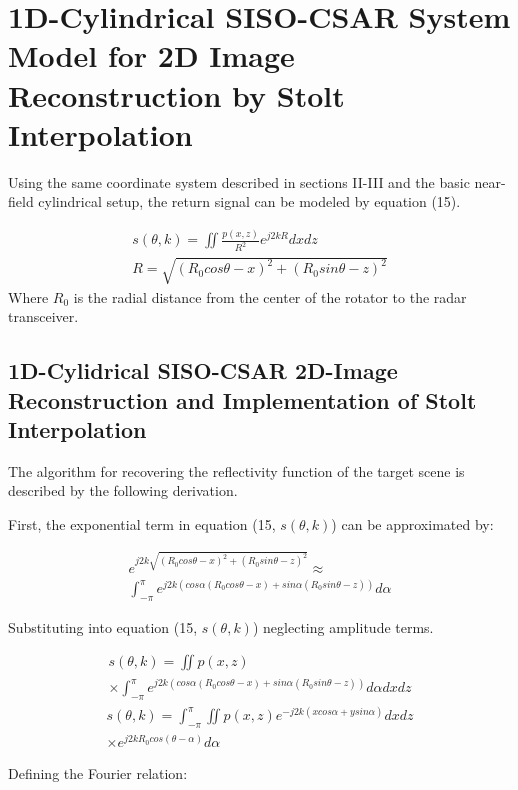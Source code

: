 \documentclass{IEEEtran}
\begin{document}


\section{1D-Cylindrical SISO-CSAR System Model for 2D Image Reconstruction by Stolt Interpolation}
Using the same coordinate system described in sections II-III and the basic near-field cylindrical setup, the return signal can be modeled by equation (15).

\begin{gather}
	s(\theta,k) = \iint \frac{p(x,z)}{R^2}e^{j2kR}dxdz \\
	R = \sqrt{(R_0 cos\theta - x)^2 + (R_0 sin\theta - z)^2}
\end{gather}
Where $R_0$ is the radial distance from the center of the rotator to the radar transceiver.

\subsection{1D-Cylidrical SISO-CSAR 2D-Image Reconstruction and Implementation of Stolt Interpolation}
The algorithm for recovering the reflectivity function of the target scene is described by the following derivation.

First, the exponential term in equation (15, $s(\theta,k)$) can be approximated by:

\begin{multline}
	e^{j2k\sqrt{(R_0 cos\theta - x)^2 + (R_0 sin\theta - z)^2}} \approx \\ \int_{-\pi}^{\pi} e^{j2k(cos\alpha(R_0cos\theta-x)+sin\alpha(R_0sin\theta - z))} d\alpha
\end{multline}

Substituting into equation (15, $s(\theta,k)$) neglecting amplitude terms.

\begin{multline}
	s(\theta,k) = \iint p(x,z) \\ 
	\times \int_{-\pi}^{\pi} e^{j2k(cos\alpha(R_0cos\theta-x)+sin\alpha(R_0sin\theta - z))} d\alpha dx dz
\end{multline}
\begin{multline}
	s(\theta,k) = \int_{-\pi}^{\pi} \iint p(x,z) e^{-j2k(xcos\alpha+ysin\alpha)}dxdz \\
	\times e^{j2kR_0cos(\theta-\alpha)}d\alpha
\end{multline}

Defining the Fourier relation:
\end{document}
